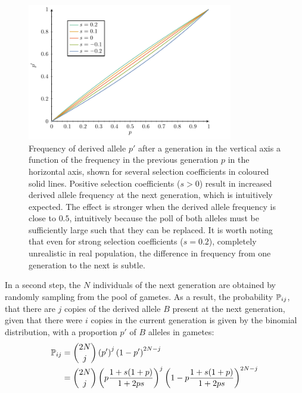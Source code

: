 \begin{figure}[H]
    \centering
    \includegraphics[width=0.8\textwidth, page=1] {figures.pdf}
    \caption[Frequency of derived {allele} after a generation]{
    Frequency of derived \gls{allele} $p'$ after a generation in the vertical axis a function of the frequency in the previous generation $p$ in the horizontal axis, shown for several selection coefficients in coloured solid lines.
    Positive selection coefficients ($s > 0$) result in increased derived \gls{allele} frequency at the next generation, which is intuitively expected.
    The effect is stronger when the derived \gls{allele} frequency is close to $0.5$, intuitively because the poll of both \glspl{allele} must be sufficiently large such that they can be replaced.
    It is worth noting that even for strong selection coefficients ($s=0.2$), completely unrealistic in real population, the difference in frequency from one generation to the next is subtle.}
    \label{fig:frequency-derived-allele}
\end{figure}


In a second step, the $N$ individuals of the next generation are obtained by randomly sampling from the pool of gametes.
As a result, the probability $\mathbb{P}_{ij}$, that there are $j$ copies of the derived \gls{allele} $B$ present at the next generation, given that there were $i$ copies in the current generation is given by the binomial distribution, with a proportion $p'$ of $B$ \glspl{allele} in gametes:
\begin{align}
    \mathbb{P}_{ij} & = \binom{2 N}{j} \left( p' \right)^j \left(1 - p' \right)^{2 N -j} \\
    & = \binom{2 N}{j} \left( p\dfrac{1+s(1+p)}{1 + 2ps} \right)^j \left(1 - p\dfrac{1+s(1+p)}{1 + 2ps} \right)^{2 N -j} \label{eq:binomial-WF}
\end{align}

